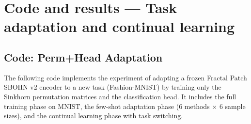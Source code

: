 \documentclass[11pt,a4paper]{report}
\begin{document}
\newpage




\section{Code and results --- Task adaptation and continual learning}

\subsection{Code: Perm+Head Adaptation}\label{app:perm_head}

The following code implements the experiment of adapting a frozen Fractal Patch SBOHN v2 encoder to a new task (Fashion-MNIST) by training only the Sinkhorn permutation matrices and the classification head. It includes the full training phase on MNIST, the few-shot adaptation phase (6 methods $\times$ 6 sample sizes), and the continual learning phase with task switching.
\end{document}
